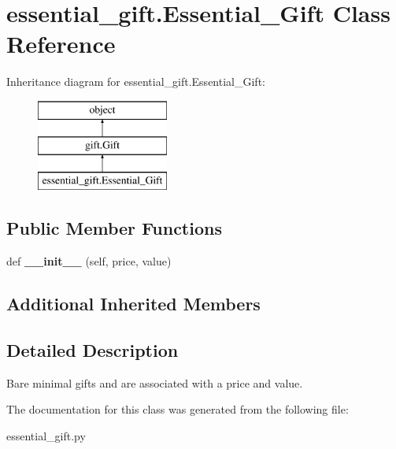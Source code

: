 \hypertarget{classessential__gift_1_1_essential___gift}{}\section{essential\+\_\+gift.\+Essential\+\_\+\+Gift Class Reference}
\label{classessential__gift_1_1_essential___gift}
Inheritance diagram for essential\+\_\+gift.\+Essential\+\_\+\+Gift\+:\begin{figure}[H]
\begin{center}
\leavevmode
\includegraphics[height=3.000000cm]{classessential__gift_1_1_essential___gift}
\end{center}
\end{figure}
\subsection*{Public Member Functions}
\begin{DoxyCompactItemize}
\item 
\mbox{\label{classessential__gift_1_1_essential___gift_a3425b38913d6abbb0d2976ea3339aadd}} 
def {\bfseries \+\_\+\+\_\+init\+\_\+\+\_\+} (self, price, value)
\end{DoxyCompactItemize}
\subsection*{Additional Inherited Members}


\subsection{Detailed Description}
\begin{DoxyVerb}Bare minimal gifts and are associated with a price and value.
\end{DoxyVerb}
 

The documentation for this class was generated from the following file\+:\begin{DoxyCompactItemize}
\item 
essential\+\_\+gift.\+py\end{DoxyCompactItemize}
